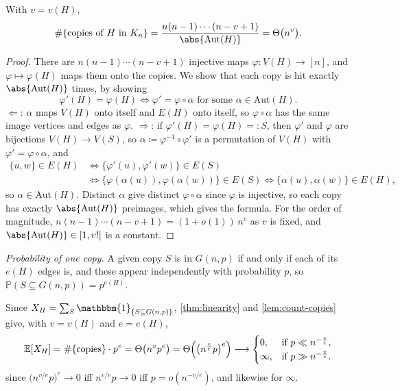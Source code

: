 \begin{lemma}\label{lem:count-copies}
    With \(v = v(H)\),
    \[
        \#\{\text{copies of } H \text{ in } K_n\} = \frac{n(n-1)\cdots(n-v+1)}{\abs{\mathrm{Aut}(H)}} = \Theta\bigl( n^{v} \bigr).
    \]
\end{lemma}

\begin{proof}
    There are \(n(n-1)\cdots(n-v+1)\) injective maps \(\varphi \colon V(H) \to [n]\), and \(\varphi \mapsto \varphi(H)\) maps them onto the copies. We show that each copy is hit exactly \(\abs{\mathrm{Aut}(H)}\) times, by showing
    \[
        \varphi'(H) = \varphi(H) \iff \varphi' = \varphi \circ \alpha \text{ for some } \alpha \in \mathrm{Aut}(H).
    \]
    \(\Leftarrow\): \(\alpha\) maps \(V(H)\) onto itself and \(E(H)\) onto itself, so \(\varphi \circ \alpha\) has the same image vertices and edges as \(\varphi\). \(\Rightarrow\): if \(\varphi'(H) = \varphi(H) =: S\), then \(\varphi'\) and \(\varphi\) are bijections \(V(H) \to V(S)\), so \(\alpha \coloneqq \varphi^{-1} \circ \varphi'\) is a permutation of \(V(H)\) with \(\varphi' = \varphi \circ \alpha\), and
    \[
        \begin{aligned}
            \{u,w\} \in E(H) &\iff \{\varphi'(u), \varphi'(w)\} \in E(S) \\
            &\iff \{\varphi(\alpha(u)), \varphi(\alpha(w))\} \in E(S) \iff \{\alpha(u), \alpha(w)\} \in E(H),
        \end{aligned}
    \]
    so \(\alpha \in \mathrm{Aut}(H)\). Distinct \(\alpha\) give distinct \(\varphi \circ \alpha\) since \(\varphi\) is injective, so each copy has exactly \(\abs{\mathrm{Aut}(H)}\) preimages, which gives the formula. For the order of magnitude, \(n(n-1)\cdots(n-v+1) = (1+o(1))\,n^{v}\) as \(v\) is fixed, and \(\abs{\mathrm{Aut}(H)} \in [1, v!]\) is a constant.
\end{proof}

\emph{Probability of one copy.} A given copy \(S\) is in \(G(n,p)\) if and only if each of its \(e(H)\) edges is, and these appear independently with probability \(p\), so \(\mathbb{P}(S \subseteq G(n,p)) = p^{e(H)}\).

Since \(X_H = \sum_{S} \mathbbm{1}_{\{S \subseteq G(n,p)\}}\), \autoref{thm:linearity} and \autoref{lem:count-copies} give, with \(v = v(H)\) and \(e = e(H)\),
\begin{equation}\label{eq:subgraph-mean}
    \mathbb{E}[X_H] = \#\{\text{copies}\} \cdot p^{e} = \Theta\bigl( n^{v} p^{e} \bigr) = \Theta\Bigl( \bigl( n^{\frac{v}{e}} p \bigr)^{e} \Bigr)
    \longrightarrow
    \begin{cases}
        0, & \text{if } p \ll n^{-\frac{v}{e}}, \\
        \infty, & \text{if } p \gg n^{-\frac{v}{e}}.
    \end{cases}
\end{equation}
since \(\bigl( n^{v/e}p \bigr)^{e} \to 0\) iff \(n^{v/e}p \to 0\) iff \(p = o(n^{-v/e})\), and likewise for \(\infty\).

